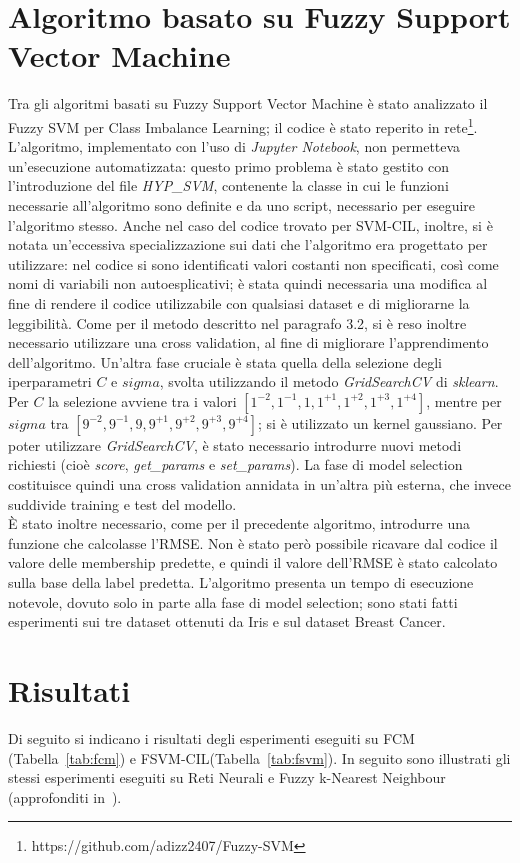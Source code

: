 \documentclass[oneside, openany]{book}
\begin{document}
	\section{Algoritmo basato su Fuzzy Support Vector Machine}
	Tra gli algoritmi basati su Fuzzy Support Vector Machine è stato analizzato il Fuzzy SVM per Class Imbalance Learning; il codice è stato reperito in rete\footnote{https://github.com/adizz2407/Fuzzy-SVM}. L'algoritmo, implementato con l'uso di \textit{Jupyter Notebook}, non permetteva un'esecuzione automatizzata: questo primo problema è stato gestito con l'introduzione del file \textit{HYP\_SVM}, contenente la classe in cui le funzioni necessarie all'algoritmo sono definite e da uno script, necessario per eseguire l'algoritmo stesso. Anche nel caso del codice trovato per SVM-CIL, inoltre, si è notata un'eccessiva specializzazione sui dati che l'algoritmo era progettato per utilizzare: nel codice si sono identificati valori costanti non specificati, così come nomi di variabili non autoesplicativi; è stata quindi necessaria una modifica al fine di rendere il codice utilizzabile con qualsiasi dataset e di migliorarne la leggibilità. Come per il metodo descritto nel paragrafo 3.2, si è reso inoltre necessario utilizzare una cross validation, al fine di migliorare l'apprendimento dell'algoritmo. Un'altra fase cruciale è stata quella della selezione degli iperparametri $C$ e $sigma$, svolta utilizzando il metodo \textit{GridSearchCV} di \textit{sklearn}. Per $C$ la selezione avviene tra i valori $[1^{-2}, 1^{-1}, 1, 1^{+1}, 1^{+2}, 1^{+3}, 1^{+4}]$, mentre per $sigma$ tra $[9^{-2}, 9^{-1}, 9, 9^{+1}, 9^{+2}, 9^{+3}, 9^{+4}]$; si è utilizzato un kernel gaussiano. Per poter utilizzare \textit{GridSearchCV}, è stato necessario introdurre nuovi metodi richiesti (cioè \textit{score}, \textit{get\_params} e \textit{set\_params}). La fase di model selection costituisce quindi una cross validation annidata in un'altra più esterna, che invece suddivide training e test del modello.\\
	\`E stato inoltre necessario, come per il precedente algoritmo, introdurre una funzione che calcolasse l'RMSE. Non è stato però possibile ricavare dal codice il valore delle membership predette, e quindi il valore dell'RMSE è stato calcolato sulla base della label predetta. L'algoritmo presenta un tempo di esecuzione notevole, dovuto solo in parte alla fase di model selection; sono stati fatti esperimenti sui tre dataset ottenuti da Iris e sul dataset Breast Cancer. 
	\section{Risultati}
		Di seguito si indicano i risultati degli esperimenti eseguiti su FCM (Tabella~\ref{tab:fcm}) e FSVM-CIL(Tabella~\ref{tab:fsvm}). In seguito sono illustrati gli stessi esperimenti eseguiti su Reti Neurali e Fuzzy k-Nearest Neighbour (approfonditi in~\cite{bib:rita}).
		
\end{document}
